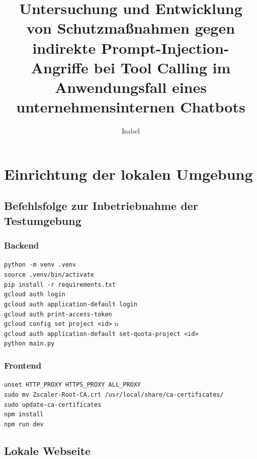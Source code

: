 \documentclass[
thesis=master,
%
language=german,
%
faculty=cb,	
%
%
%
%
%
%
%
%
graduatedtoc,
%
fancy,
%
glossaryfront,
%
%
%
%
%
%
%
%
%
%
%
%
%
%
%
%
%
]{hsmw-vorlage-rw}
\title[Examination and development of protective measures against indirect prompt injection attacks in tool calling in the use case of an internal company chatbot]{Untersuchung und Entwicklung von Schutzmaßnahmen gegen indirekte Prompt-Injection-Angriffe bei Tool Calling im Anwendungsfall eines unternehmensinternen Chatbots}
\author*{Isabel}{Norpoth}[]<figs/Unterschrift_Isabel.png>
\begin{document}








\appendix

\chapter{Einrichtung der lokalen Umgebung}\label{ch:anhang_setup}

\section{Befehlsfolge zur Inbetriebnahme der Testumgebung}

\subsection{Backend}

\texttt{python -m venv .venv} \\
\texttt{source .venv/bin/activate} \\
\texttt{pip install -r requirements.txt} \\
\texttt{gcloud auth login} \\
\texttt{gcloud auth application-default login} \\
\texttt{gcloud auth print-access-token} \\
\texttt{gcloud config set project \textless id\textgreater} n \\
\texttt{gcloud auth application-default set-quota-project \textless id\textgreater} \\
\texttt{python main.py} \\

\subsection{Frontend}

\texttt{unset HTTP\_PROXY HTTPS\_PROXY ALL\_PROXY} \\
\texttt{sudo mv Zscaler-Root-CA.crt /usr/local/share/ca-certificates/} \\
\texttt{sudo update-ca-certificates} \\
\texttt{npm install} \\
\texttt{npm run dev} \\


\section{Lokale Webseite}\label{sec:anhang_webseite}
\end{document}
